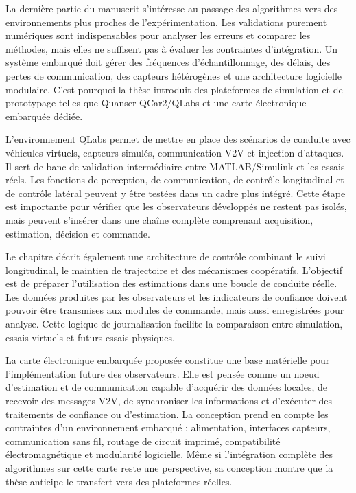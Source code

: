 La dernière partie du manuscrit s'intéresse au passage des algorithmes vers des environnements plus proches de l'expérimentation. Les validations purement numériques sont indispensables pour analyser les erreurs et comparer les méthodes, mais elles ne suffisent pas à évaluer les contraintes d'intégration. Un système embarqué doit gérer des fréquences d'échantillonnage, des délais, des pertes de communication, des capteurs hétérogènes et une architecture logicielle modulaire. C'est pourquoi la thèse introduit des plateformes de simulation et de prototypage telles que Quanser QCar2/QLabs et une carte électronique embarquée dédiée.

L'environnement QLabs permet de mettre en place des scénarios de conduite avec véhicules virtuels, capteurs simulés, communication V2V et injection d'attaques. Il sert de banc de validation intermédiaire entre MATLAB/Simulink et les essais réels. Les fonctions de perception, de communication, de contrôle longitudinal et de contrôle latéral peuvent y être testées dans un cadre plus intégré. Cette étape est importante pour vérifier que les observateurs développés ne restent pas isolés, mais peuvent s'insérer dans une chaîne complète comprenant acquisition, estimation, décision et commande.

Le chapitre décrit également une architecture de contrôle combinant le suivi longitudinal, le maintien de trajectoire et des mécanismes coopératifs. L'objectif est de préparer l'utilisation des estimations dans une boucle de conduite réelle. Les données produites par les observateurs et les indicateurs de confiance doivent pouvoir être transmises aux modules de commande, mais aussi enregistrées pour analyse. Cette logique de journalisation facilite la comparaison entre simulation, essais virtuels et futurs essais physiques.

La carte électronique embarquée proposée constitue une base matérielle pour l'implémentation future des observateurs. Elle est pensée comme un noeud d'estimation et de communication capable d'acquérir des données locales, de recevoir des messages V2V, de synchroniser les informations et d'exécuter des traitements de confiance ou d'estimation. La conception prend en compte les contraintes d'un environnement embarqué : alimentation, interfaces capteurs, communication sans fil, routage de circuit imprimé, compatibilité électromagnétique et modularité logicielle. Même si l'intégration complète des algorithmes sur cette carte reste une perspective, sa conception montre que la thèse anticipe le transfert vers des plateformes réelles.

